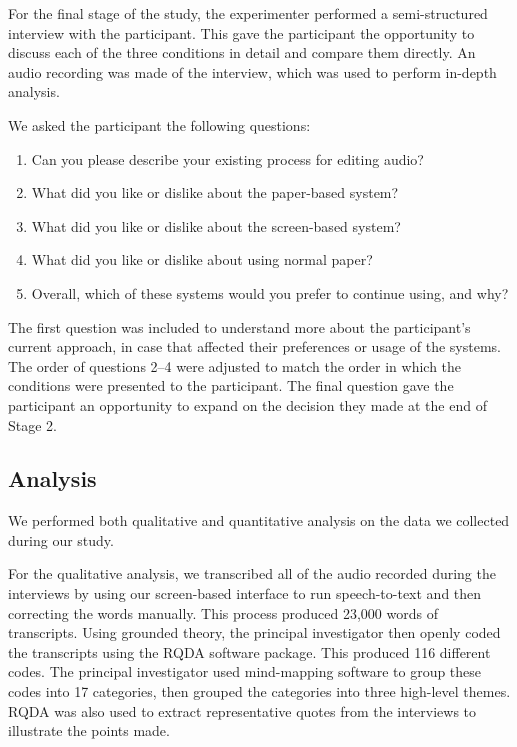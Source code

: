 For the final stage of the study, the experimenter performed a semi-structured interview with the participant. This
gave the participant the opportunity to discuss each of the three conditions in detail and compare them directly. An
audio recording was made of the interview, which was used to perform in-depth analysis.

We asked the participant the following questions:

{\singlespacing
\begin{enumerate}
  \item Can you please describe your existing process for editing audio?
  \item What did you like or dislike about the paper-based system?
  \item What did you like or dislike about the screen-based system?
  \item What did you like or dislike about using normal paper?
  \item Overall, which of these systems would you prefer to continue using, and why?
\end{enumerate}
}

The first question was included to understand more about the participant's current approach, in case that affected
their preferences or usage of the systems.  The order of questions 2--4 were adjusted to match the order in which the
conditions were presented to the participant.  The final question gave the participant an opportunity to expand on the
decision they made at the end of Stage 2.

\subsection{Analysis}

We performed both qualitative and quantitative analysis on the data we collected during our study.

For the qualitative analysis, we transcribed all of the audio recorded during the interviews by using our screen-based
interface to run speech-to-text and then correcting the words manually. This process produced 23,000 words of
transcripts. Using grounded theory, the principal investigator then openly coded the transcripts using the RQDA
software package. This produced 116 different codes. The principal investigator used mind-mapping software to group
these codes into 17 categories, then grouped the categories into three high-level themes. RQDA was also used to extract
representative quotes from the interviews to illustrate the points made.

